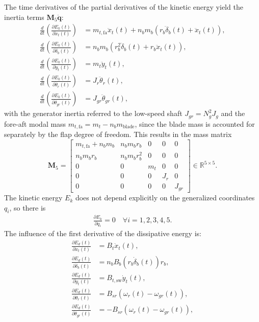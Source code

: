     The time derivatives of the partial derivatives of the kinetic energy yield the inertia terms $\mathbf{M}_5\ddot{\bm{q}}$:
    \begin{align*}
        \frac{d}{dt} \left(\frac{\partial E_k(t)}{\partial \dot{x}_t(t)} \right) &= m_{t,\text{fa}}\ddot{x}_t(t) + n_b m_b(r_b\ddot{\delta}_b(t) + \ddot{x}_t(t)), \\
        \frac{d}{dt} \left(\frac{\partial E_k(t)}{\partial \dot{\delta}_b(t)} \right) &= n_b m_b(r_b^2\ddot{\delta}_b(t) + r_b\ddot{x}_t(t)), \\
        \frac{d}{dt} \left(\frac{\partial E_k(t)}{\partial \dot{y}_t(t)} \right) &= m_t\ddot{y}_t(t), \\
        \frac{d}{dt} \left(\frac{\partial E_k(t)}{\partial \dot{\theta}_r(t)} \right) &= J_r\ddot{\theta}_r(t), \\
        \frac{d}{dt} \left(\frac{\partial E_k(t)}{\partial \dot{\theta}_{gr}(t)} \right) &= J_{gr}\ddot{\theta}_{gr}(t),
    \end{align*}
    with the generator inertia referred to the low-speed shaft $J_{gr} = N_g^2 J_g$ and the fore-aft modal mass $m_{t,\text{fa}} = m_t - n_b m_{\text{blade}}$, since the blade mass is accounted for separately by the flap degree of freedom. This results in the mass matrix
    \[
    \mathbf{M}_5 = \begin{bmatrix}
        m_{t,\text{fa}} + n_b m_b & n_b m_b r_b & 0 & 0 & 0 \\
        n_b m_b r_b & n_b m_b r_b^2 & 0 & 0 & 0 \\
        0 & 0 & m_t & 0 & 0 \\
        0 & 0 & 0 & J_r & 0 \\
        0 & 0 & 0 & 0 & J_{gr}
    \end{bmatrix}  \in \mathbb{R}^{5 \times 5}.
    \]
    The kinetic energy $E_k$ does not depend explicitly on the generalized coordinates $q_i$, so there is
    \begin{align*}
        \frac{\partial E_k}{\partial q_i }= 0\quad \forall i = 1, 2, 3, 4, 5.
    \end{align*}
    The influence of the first derivative of the dissipative energy is:
    \begin{align*}
        \frac{\partial E_d(t)}{\partial \dot{x}_t(t) } &= B_t \dot{x}_t(t), \\
        \frac{\partial E_d(t)}{\partial \dot{\delta}_b(t) } &= n_b B_b(r_b \dot{\delta}_b(t)) r_b, \\
        \frac{\partial E_d(t)}{\partial \dot{y}_t(t) } &= B_{t,\text{sw}} \dot{y}_t(t), \\
        \frac{\partial E_d(t)}{\partial \dot{\theta}_r(t) } &= B_{sr}(\omega_r(t) - \omega_{gr}(t)), \\
        \frac{\partial E_d(t)}{\partial \dot{\theta}_{gr}(t) } &= -B_{sr}(\omega_r(t) - \omega_{gr}(t)),
    \end{align*}
